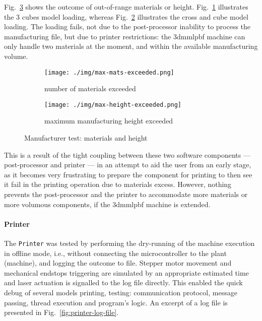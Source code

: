 Fig.~\ref{fig:manuf-test-materials-height} shows the outcome of out-of-range
materials or height. Fig.~\ref{fig:manuf-max-mat-exceeded} illustrates the 3 cubes model
loading, whereas Fig.~\ref{fig:manuf-max-height-exceeded} illustrates the cross
and cube model loading. The loading fails, not due to the post-processor inability to process
the manufacturing file, but due to printer restrictions: the \gls{3dmmlpbf} machine
can only handle two materials at the
moment, and within the available manufacturing volume.

\begin{figure}[htbp!]
  \centering
  \begin{subfigure}[t]{0.48\textwidth}
  \centering
  \texttt{[image: ./img/max-mats-exceeded.png]}
  \caption{number of materials exceeded}%
  \label{fig:manuf-max-mat-exceeded}
  \end{subfigure}
%
  \begin{subfigure}[t]{0.48\textwidth}
  \centering
  \texttt{[image: ./img/max-height-exceeded.png]}
  \caption{maximum manufacturing height exceeded}%
  \label{fig:manuf-max-height-exceeded}
\end{subfigure}
  \caption{Manufacturer test: materials and height}%
  \label{fig:manuf-test-materials-height}
\end{figure}

This is a result of the tight coupling between these two software components ---
post-processor and printer --- in an attempt to aid the user from an early
stage, as it becomes very frustrating to prepare the component for printing to
then see it fail in the printing operation due to materials excess. However,
nothing prevents the post-processor and the printer to accommodate more
materials or more volumous components,
if the \gls{3dmmlpbf} machine is extended.

\paragraph{Printer}
The \texttt{Printer} was tested by performing the dry-running of the
machine execution in offline mode, i.e., without connecting the microcontroller
to the plant (machine), and logging the outcome to file. Stepper motor movement
and mechanical endstops triggering  are simulated by an appropriate estimated
time and laser actuation is signalled to the log file directly.
%
This enabled the quick debug of several models printing, testing: communication
protocol, message passing, thread execution and program's logic. An excerpt of
a log file is presented in Fig.~\ref{fig:printer-log-file}.

